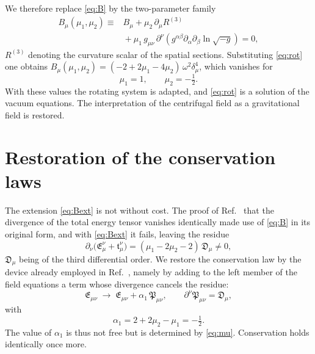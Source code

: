\documentclass[aps,prd,reprint,amsmath,amssymb,nofootinbib,longbibliography]{revtex4-2}
\begin{document}
We therefore replace \eqref{eq:B} by the two-parameter family
\begin{equation}
\begin{split}
B_{\mu}(\mu_1,\mu_2) \equiv {}& B_{\mu} + \mu_2\, \partial_{\mu} R^{(3)} \\
 &{} + \mu_1\, g_{\mu\nu}\, \partial^{\nu}\!\left( g^{\alpha\beta}\partial_{\alpha}
   \partial_{\beta} \ln\sqrt{-g}\right) = 0 ,
\end{split}
\label{eq:Bext}
\end{equation}
$R^{(3)}$ denoting the curvature scalar of the spatial sections. Substituting \eqref{eq:rot} one
obtains $B_{\mu}(\mu_1,\mu_2) = (-2 + 2\mu_1 - 4\mu_2)\,\omega^{2}\delta_{\mu}^{4}$, which vanishes
for
\begin{equation}
\mu_1 = 1 , \qquad \mu_2 = -\tfrac{1}{2} .
\label{eq:mu}
\end{equation}
With these values the rotating system is adapted, and \eqref{eq:rot} is a solution of the vacuum
equations. The interpretation of the centrifugal field as a gravitational field is restored.

\section{Restoration of the conservation laws}

The extension \eqref{eq:Bext} is not without cost. The proof of Ref.~\cite{eingross1913} that the
divergence of the total energy tensor vanishes identically made use of \eqref{eq:B} in its original
form, and with \eqref{eq:Bext} it fails, leaving the residue
\begin{equation}
\partial_{\nu}\big( \mathfrak{E}^{\nu}_{\mu} + \mathfrak{t}^{\nu}_{\mu} \big)
 = (\mu_1 - 2\mu_2 - 2)\, \mathfrak{D}_{\mu} \neq 0 ,
\end{equation}
$\mathfrak{D}_{\mu}$ being of the third differential order. We restore the conservation law by the
device already employed in Ref.~\cite{ein1912b}, namely by adding to the left member of the field
equations a term whose divergence cancels the residue:
\begin{equation}
\mathfrak{E}_{\mu\nu} \;\longrightarrow\; \mathfrak{E}_{\mu\nu}
 + \alpha_1\, \mathfrak{P}_{\mu\nu} , \qquad
\partial^{\nu}\mathfrak{P}_{\mu\nu} = \mathfrak{D}_{\mu} ,
\label{eq:alpha1}
\end{equation}
with
\begin{equation}
\alpha_1 = 2 + 2\mu_2 - \mu_1 = -\tfrac{1}{2} .
\end{equation}
The value of $\alpha_1$ is thus not free but is determined by \eqref{eq:mu}. Conservation holds
identically once more.
\end{document}
